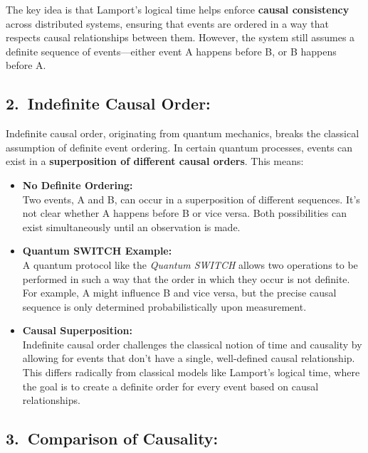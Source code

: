 The key idea is that Lamport’s logical time helps enforce \textbf{causal consistency} across distributed systems, ensuring that events are ordered in a way that respects causal relationships between them. However, the system still assumes a definite sequence of events—either event A happens before B, or B happens before A.

\subsection*{2.\ Indefinite Causal Order:}

Indefinite causal order, originating from quantum mechanics, breaks the classical assumption of definite event ordering. In certain quantum processes, events can exist in a \textbf{superposition of different causal orders}. This means:

\begin{itemize}[leftmargin=1.5em]
\item \textbf{No Definite Ordering:}\\
  Two events, A and B, can occur in a superposition of different sequences. It's not clear whether A happens before B or vice versa. Both possibilities can exist simultaneously until an observation is made.
\item \textbf{Quantum SWITCH Example:}\\
  A quantum protocol like the \emph{Quantum SWITCH} allows two operations to be performed in such a way that the order in which they occur is not definite. For example, A might influence B and vice versa, but the precise causal sequence is only determined probabilistically upon measurement.
\item \textbf{Causal Superposition:}\\
  Indefinite causal order challenges the classical notion of time and causality by allowing for events that don't have a single, well-defined causal relationship. This differs radically from classical models like Lamport’s logical time, where the goal is to create a definite order for every event based on causal relationships.
\end{itemize}

\subsection*{3.\ Comparison of Causality:}

